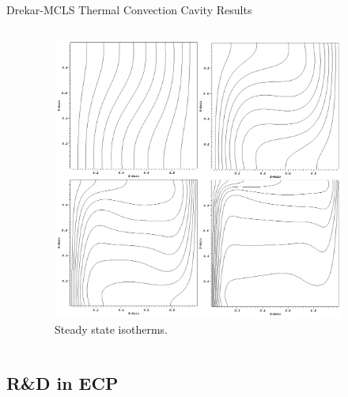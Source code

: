 \documentclass{beamer}
\begin{document}
\begin{frame}{Drekar-MCLS Thermal Convection Cavity Results}
\begin{columns}
\begin{column}{0.6\textwidth}
    \end{column}
    \begin{column}{0.4\textwidth}
      \vspace{-0.4in}
      \begin{figure}
        \centering
        \includegraphics[width=0.9\textwidth]{convection_isotherms}
        \caption{Steady state isotherms.}
      \end{figure}
    \end{column}

  \end{columns}

\end{frame}

\subsection{R\&D in ECP}
\end{document}
